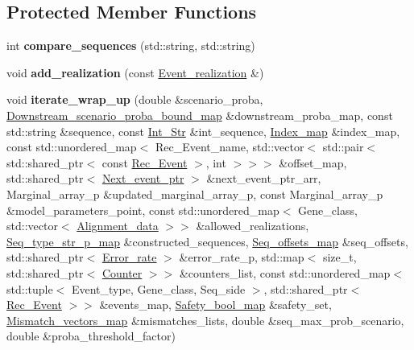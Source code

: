 \subsection*{Protected Member Functions}
\begin{DoxyCompactItemize}
\item 
\mbox{\label{classRec__Event_ae55f294d71bd8f52cec13d318515b799}} 
int {\bfseries compare\+\_\+sequences} (std\+::string, std\+::string)
\item 
\mbox{\label{classRec__Event_a3aa2d2d685646b82cc04e25d3395e9ab}} 
void {\bfseries add\+\_\+realization} (const \hyperlink{structEvent__realization}{Event\+\_\+realization} \&)
\item 
\mbox{\label{classRec__Event_a0922f15959f097b4e1f1f4ef00c48d48}} 
void {\bfseries iterate\+\_\+wrap\+\_\+up} (double \&scenario\+\_\+proba, \hyperlink{classEnum__fast__memory__map}{Downstream\+\_\+scenario\+\_\+proba\+\_\+bound\+\_\+map} \&downstream\+\_\+proba\+\_\+map, const std\+::string \&sequence, const \hyperlink{classInt__Str}{Int\+\_\+\+Str} \&int\+\_\+sequence, \hyperlink{classEnum__fast__memory__map}{Index\+\_\+map} \&index\+\_\+map, const std\+::unordered\+\_\+map$<$ Rec\+\_\+\+Event\+\_\+name, std\+::vector$<$ std\+::pair$<$ std\+::shared\+\_\+ptr$<$ const \hyperlink{classRec__Event}{Rec\+\_\+\+Event} $>$, int $>$$>$$>$ \&offset\+\_\+map, std\+::shared\+\_\+ptr$<$ \hyperlink{classRec__Event}{Next\+\_\+event\+\_\+ptr} $>$ \&next\+\_\+event\+\_\+ptr\+\_\+arr, Marginal\+\_\+array\+\_\+p \&updated\+\_\+marginal\+\_\+array\+\_\+p, const Marginal\+\_\+array\+\_\+p \&model\+\_\+parameters\+\_\+point, const std\+::unordered\+\_\+map$<$ Gene\+\_\+class, std\+::vector$<$ \hyperlink{structAlignment__data}{Alignment\+\_\+data} $>$$>$ \&allowed\+\_\+realizations, \hyperlink{classEnum__fast__memory__map}{Seq\+\_\+type\+\_\+str\+\_\+p\+\_\+map} \&constructed\+\_\+sequences, \hyperlink{classEnum__fast__memory__dual__key__map}{Seq\+\_\+offsets\+\_\+map} \&seq\+\_\+offsets, std\+::shared\+\_\+ptr$<$ \hyperlink{classError__rate}{Error\+\_\+rate} $>$ \&error\+\_\+rate\+\_\+p, std\+::map$<$ size\+\_\+t, std\+::shared\+\_\+ptr$<$ \hyperlink{classCounter}{Counter} $>$$>$ \&counters\+\_\+list, const std\+::unordered\+\_\+map$<$ std\+::tuple$<$ Event\+\_\+type, Gene\+\_\+class, Seq\+\_\+side $>$, std\+::shared\+\_\+ptr$<$ \hyperlink{classRec__Event}{Rec\+\_\+\+Event} $>$$>$ \&events\+\_\+map, \hyperlink{classEnum__fast__memory__map}{Safety\+\_\+bool\+\_\+map} \&safety\+\_\+set, \hyperlink{classEnum__fast__memory__map}{Mismatch\+\_\+vectors\+\_\+map} \&mismatches\+\_\+lists, double \&seq\+\_\+max\+\_\+prob\+\_\+scenario, double \&proba\+\_\+threshold\+\_\+factor)
\end{DoxyCompactItemize}
